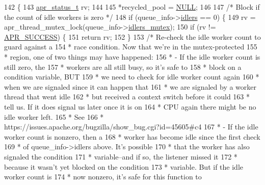 \begin{DoxyCode}
142 \{
143     \hyperlink{group__apr__errno_gaa5105fa83cc322f09382292db8b47593}{apr\_status\_t} rv;
144 
145     *recycled\_pool = \hyperlink{pcre_8txt_ad7f989d16aa8ca809a36bc392c07fba1}{NULL};
146 
147     \textcolor{comment}{/* Block if the count of idle workers is zero */}
148     \textcolor{keywordflow}{if} (queue\_info->\hyperlink{structfd__queue__info__t_a34f88b2125fb629dd4200cf75568bb1d}{idlers} == 0) \{
149         rv = apr\_thread\_mutex\_lock(queue\_info->\hyperlink{structfd__queue__info__t_a18d58b9d46ec7629daee1c309161b8d0}{idlers\_mutex});
150         \textcolor{keywordflow}{if} (rv != \hyperlink{group__apr__errno_ga9ee311b7bf1c691dc521d721339ee2a6}{APR\_SUCCESS}) \{
151             \textcolor{keywordflow}{return} rv;
152         \}
153         \textcolor{comment}{/* Re-check the idle worker count to guard against a}
154 \textcolor{comment}{         * race condition.  Now that we're in the mutex-protected}
155 \textcolor{comment}{         * region, one of two things may have happened:}
156 \textcolor{comment}{         *   - If the idle worker count is still zero, the}
157 \textcolor{comment}{         *     workers are all still busy, so it's safe to}
158 \textcolor{comment}{         *     block on a condition variable, BUT}
159 \textcolor{comment}{         *     we need to check for idle worker count again}
160 \textcolor{comment}{         *     when we are signaled since it can happen that}
161 \textcolor{comment}{         *     we are signaled by a worker thread that went idle}
162 \textcolor{comment}{         *     but received a context switch before it could}
163 \textcolor{comment}{         *     tell us. If it does signal us later once it is on}
164 \textcolor{comment}{         *     CPU again there might be no idle worker left.}
165 \textcolor{comment}{         *     See}
166 \textcolor{comment}{         *     https://issues.apache.org/bugzilla/show\_bug.cgi?id=45605#c4}
167 \textcolor{comment}{         *   - If the idle worker count is nonzero, then a}
168 \textcolor{comment}{         *     worker has become idle since the first check}
169 \textcolor{comment}{         *     of queue\_info->idlers above.  It's possible}
170 \textcolor{comment}{         *     that the worker has also signaled the condition}
171 \textcolor{comment}{         *     variable--and if so, the listener missed it}
172 \textcolor{comment}{         *     because it wasn't yet blocked on the condition}
173 \textcolor{comment}{         *     variable.  But if the idle worker count is}
174 \textcolor{comment}{         *     now nonzero, it's safe for this function to}

\end{DoxyCode}
